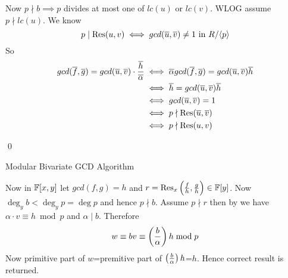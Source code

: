 \documentclass[a4paper, 11pt]{article}
\renewenvironment{proof}{\noindent{\it \textbf{Proof:}}\hspace*{1em}}{\qed\bigskip\\}
\begin{document}
{\begin{proof}
\begin{enumerate}
			Now $p\nmid b\implies p$ divides at most one of $lc(u)$ or $lc(v)$. WLOG assume $p\nmid lc(u)$. We know $$p\mid \operatorname{Res} (u,v)\iff gcd(\overline{u},\overline{v})\neq 1\text{ in }R/\langle p\rangle$$So \begin{align*}
				gcd(\overline{f},\overline{g})=gcd(\overline{u},\overline{v})\cdot \frac{\overline{h}}{\overline{\alpha}} & \iff \overline{\alpha} gcd(\overline{f},\overline{g})=gcd(\overline{u},\overline{v})\overline{h} \\
				                                                            & \iff \overline{h}=gcd(\overline{u},\overline{v})\overline{h}                       \\
				                                                            & \iff gcd(\overline{u},\overline{v})=1                              \\
				                                                            & \iff p\nmid \operatorname{Res}(\overline{u},\overline{v})                        \\
				                                                            & \iff p\nmid \operatorname{Res}(u,v)
			\end{align*}
			
		\end{enumerate}
	\end{proof}
	

	
	\begin{algorithm}[H]
	\DontPrintSemicolon
		\caption{Modular Bivariate GCD Algorithm}
	\end{algorithm}
	
		Now in $\mathbb{F}[x,y]$ let $gcd(f,g)=h$ and $r=\operatorname{Res}_x\left(\frac{f}{h},\frac{g}{h}\right)\in \mathbb{F}[y]$. Now $\deg_yb<\deg_yp=\deg p$ and hence $p\nmid b$. Assume $p\nmid r$ then by  we have $\alpha \cdot v \equiv h\bmod p$ and $\alpha\mid b$. Therefore $$w\equiv bv\equiv \left(\frac{b}{\alpha}\right)h\bmod p$$ Now primitive part of $w$=premitive part of $\left(\frac{b}{\alpha}\right)h$=$h$. Hence correct result is returned.
		
}
\end{document}

